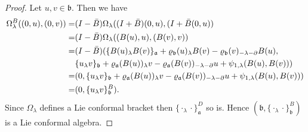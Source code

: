 \documentclass[10pt,a4paper]{amsart}
\def\Vs{\mathfrak{a}}
\def\Ws{\mathfrak{b}}
\def\la{\lambda}
\def\p{\partial}
\def\rep{\varrho}
\begin{document}
\begin{proof}
Let $u,v \in \Ws$. Then we have
\begin{align*}
\Omega^B_\lambda((0,u) ,(0,v))=& (I-\Bar{B})\Omega_\lambda((I+\Bar{B})(0,u), (I+\Bar{B}(0,u))\\
=& (I-\Bar{B})\Omega_\lambda((B(u),u),(B(v),v)) \\
=&(I-\Bar{B})(\{B(u)_\la B(v)\}_\Vs
  + \rep_\Ws(u)_\la B(v) - \rep_\Ws(v)_{-\la-\p}B(u),\\
  & \{u_\la v\}_\Ws + \rep_\Vs(B(u))_\la v
             - \rep_\Vs(B(v))_{-\la-\p}u
             + \psi_{1,\la}(B(u),B(v))) \\
      =& (0,\{u_\la v\}_\Ws + \rep_\Vs(B(u))_\la v
             - \rep_\Vs(B(v))_{-\la-\p}u
             + \psi_{1,\la}(B(u),B(v))) \\ 
=& (0,\{u_\la v\}^B_\Ws).     
\end{align*}
Since $\Omega_\la$ defines a Lie conformal bracket then $\{\cdot_\la \cdot\}^D_\Vs$ so is. Hence $(\Ws,\{\cdot_\la \cdot\}^B_\Ws)$ is a Lie conformal algebra.

\end{proof}
\end{document}
